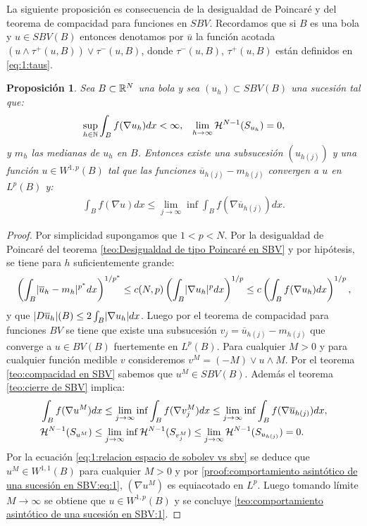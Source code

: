 \documentclass[a4paper,11pt,spanish, twoside, leqno]{tfm-uam}
\newtheorem{prop}[teo]{Proposición}
\begin{document}
La siguiente proposición es consecuencia de la desigualdad de Poincaré y del teorema de compacidad para funciones en $SBV$. Recordamos que si $B$ es una bola y $u\in SBV(B)$ entonces denotamos por $\overline{u}$ la función acotada $(u\wedge\tau^{+}(u,B))\vee \tau^{-}(u,B)$, donde $\tau^{-}(u,B)$, $\tau^{+}(u,B)$ están definidos en \ref{eq:1:taus}.
\begin{prop}\label{teo:comportamiento asintótico de una sucesión en SBV}
Sea $B\subset \mathbb{R}^{N}$ una bola y sea $(u_{h})\subset SBV(B)$ una sucesión tal que:
\begin{align*}
\begin{array}{ll}
\displaystyle
\sup_{h\in \mathbb{N}}\int_{B}f(\nabla{u_{h}})dx<\infty, &  \displaystyle \lim_{h\to \infty}\mathcal{H}^{N-1}(S_{u_{h}})=0,
\end{array}
\end{align*}
y $m_{h}$ las medianas de $u_{h}$ en $B$. Entonces existe una subsucesión $(u_{h(j)})$ y una función $u\in W^{1,p}(B)$ tal que las funciones $\overline{u}_{h(j)}-m_{h(j)}$ convergen a $u$ en $L^{p}(B)$ y:
\begin{align}\label{teo:comportamiento asintótico de una sucesión en SBV:1}
\int_{B}f(\nabla{u})dx\leq \lim_{j\to \infty}\inf\int_{B}f(\nabla{\overline{u}_{h(j)}})dx.
\end{align}
\end{prop}
\begin{proof}
Por simplicidad supongamos que $1<p<N$. Por la desigualdad de Poincaré del teorema \ref{teo:Desigualdad de tipo Poincaré en SBV} y por hipótesis, se tiene para $h$ suficientemente grande:
\begin{align*}
\left( \int_{B}\lvert\overline{u}_{h}-m_{h}\rvert^{p^{*}}dx\right)^{1/p^{*}}\leq c(N,p)\left (\int_{B}\lvert\nabla{u_{h}}\rvert^{p}dx \right  )^{1/p}\leq c\left (\int_{B} f(\nabla{u_{h}}) dx\right )^{1/p},
\end{align*}
y que $\lvert D\overline{u}_{h}\rvert(B)\leq 2\int_{B}\lvert\nabla{u_{h}}\rvert dx$. Luego por el teorema de compacidad para funciones $BV$ se tiene que existe una subsucesión $v_{j}=\overline{u}_{h(j)}-m_{h(j)}$ que converge a $u\in BV(B)$ fuertemente en $L^{p}(B)$. Para cualquier $M>0$ y para cualquier función medible $v$ consideremos $v^{M}=(-M)\vee u \wedge M$. Por el teorema \ref{teo:compacidad en SBV} sabemos que $u^{M}\in SBV(B)$. Además el teorema \ref{teo:cierre de SBV} implica:
\begin{align}\label{proof:comportamiento asintótico de una sucesión en SBV:eq:1}
&\int_{B}f(\nabla{u^{M}})dx\leq \lim_{j\to \infty}\inf\int_{B}f(\nabla{v_{j}^{M}})dx\leq \lim_{j\to \infty}\inf\int_{B} f(\nabla{\overline{u}_{h(j)}})dx,\\
&\mathcal{H}^{N-1}(S_{u^{M}})\leq \lim_{j\to \infty}\inf\mathcal{H}^{N-1}(S_{v_{j}^{M}})\leq \lim_{j\to \infty}\mathcal{H}^{N-1}(S_{u_{h(j)}})=0.\nonumber
\end{align}
Por la ecuación \ref{eq:1:relacion espacio de sobolev vs sbv} se deduce que $u^{M}\in W^{1,1}(B)$ para cualquier $M>0$ y por \ref{proof:comportamiento asintótico de una sucesión en SBV:eq:1}, $(\nabla{u^{M}})$ es equiacotado en $L^{p}$. Luego tomando límite $M\to\infty$ se obtiene que $u\in W^{1,p}(B)$ y se concluye \ref{teo:comportamiento asintótico de una sucesión en SBV:1}.
\end{proof}
\end{document}
